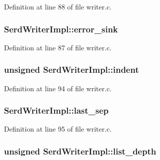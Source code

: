 Definition at line 88 of file writer.\+c.

\subsubsection[{\texorpdfstring{error\+\_\+sink}{error_sink}}]{ Serd\+Writer\+Impl\+::error\+\_\+sink}\hypertarget{struct_serd_writer_impl_aaa70bfa3692cc1306a44829465b8e3e6}{}\label{struct_serd_writer_impl_aaa70bfa3692cc1306a44829465b8e3e6}


Definition at line 87 of file writer.\+c.

\subsubsection[{\texorpdfstring{indent}{indent}}]{\setlength{\rightskip}{0pt plus 5cm}unsigned Serd\+Writer\+Impl\+::indent}\hypertarget{struct_serd_writer_impl_a9603d4b7de01f0d78fd064ebf9311fff}{}\label{struct_serd_writer_impl_a9603d4b7de01f0d78fd064ebf9311fff}


Definition at line 94 of file writer.\+c.

\subsubsection[{\texorpdfstring{last\+\_\+sep}{last_sep}}]{ Serd\+Writer\+Impl\+::last\+\_\+sep}\hypertarget{struct_serd_writer_impl_a9dcf031aeff870976bd44e4966c39835}{}\label{struct_serd_writer_impl_a9dcf031aeff870976bd44e4966c39835}


Definition at line 95 of file writer.\+c.

\subsubsection[{\texorpdfstring{list\+\_\+depth}{list_depth}}]{\setlength{\rightskip}{0pt plus 5cm}unsigned Serd\+Writer\+Impl\+::list\+\_\+depth}\hypertarget{struct_serd_writer_impl_a976831995112596f11a736f94dad065a}{}\label{struct_serd_writer_impl_a976831995112596f11a736f94dad065a}


